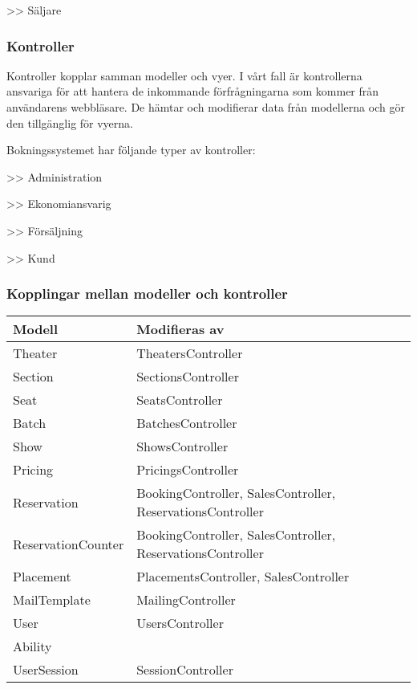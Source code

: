 \documentclass[a4paper, twoside, 11pt, titlepage]{article}
\begin{document}
		>> Säljare

		\subsubsection{Kontroller}


		Kontroller kopplar samman modeller och vyer. I vårt fall är kontrollerna ansvariga för att hantera de inkommande förfrågningarna som kommer från användarens webbläsare. De hämtar och modifierar data från modellerna och gör den tillgänglig för vyerna.

		Bokningssystemet har följande typer av kontroller:

		>> Administration

		>> Ekonomiansvarig

		>> Försäljning

		>> Kund

		\clearpage %
		\subsubsection{Kopplingar mellan modeller och kontroller}


		\begin {table} [ht] \begin{tabular} {  p{3.4cm} p{11.7cm} }
			\hline
			{\sffamily\textbf{Modell}} & {\sffamily\textbf{Modifieras av}} \\
			\hline
			{Theater} & {TheatersController} \\
			\hline
			{Section} & {SectionsController} \\
			\hline
			{Seat} & {SeatsController} \\
			\hline
			{Batch} & {BatchesController} \\
			\hline
			{Show} & {ShowsController} \\
			\hline
			{Pricing} & {PricingsController} \\
			\hline
			{Reservation} & {BookingController, SalesController, ReservationsController} \\
			\hline
			{ReservationCounter} & {BookingController, SalesController, ReservationsController} \\
			\hline
			{Placement} & {PlacementsController, SalesController} \\
			\hline
			{MailTemplate} & {MailingController} \\
			\hline
			{User} & {UsersController} \\
			\hline
			{Ability} & { } \\
			\hline
			{UserSession} & {SessionController} \\
			\hline
		\end{tabular} \end{table} \FloatBarrier
\end{document}

